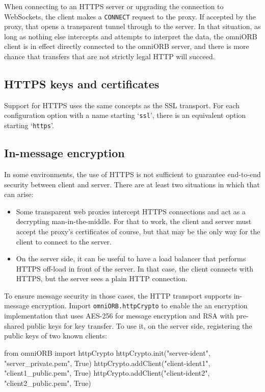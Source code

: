\documentclass[11pt,oneside,a4paper]{book}
\newcommand{\code}[1]{\texttt{#1}}
\begin{document}
When connecting to an HTTPS server or upgrading the connection to
WebSockets, the client makes a \code{CONNECT} request to the proxy. If
accepted by the proxy, that opens a transparent tunnel through to the
server. In that situation, as long as nothing else intercepts and
attempts to interpret the data, the omniORB client is in effect
directly connected to the omniORB server, and there is more chance
that transfers that are not strictly legal HTTP will succeed.


\subsection{HTTPS keys and certificates}

Support for HTTPS uses the same concepts as the SSL transport. For
each configuration option with a name starting `\code{ssl}', there is
an equivalent option starting `\code{https}'.


\subsection{In-message encryption}

In some environments, the use of HTTPS is not sufficient to guarantee
end-to-end security between client and server. There are at least two
situations in which that can arise:

\begin{itemize}
  \item Some transparent web proxies intercept HTTPS connections and
    act as a decrypting man-in-the-middle. For that to work, the
    client and server must accept the proxy's certificates of course,
    but that may be the only way for the client to connect to the
    server.

  \item On the server side, it can be useful to have a load balancer
    that performs HTTPS off-load in front of the server. In that case,
    the client connects with HTTPS, but the server sees a plain HTTP
    connection.
\end{itemize}

To ensure message security in those cases, the HTTP transport supports
in-message encryption. Import \code{omniORB.httpCrypto} to enable the
an encryption implementation that uses AES-256 for message encryption
and RSA with pre-shared public keys for key transfer. To use it, on
the server side, registering the public keys of two known clients:

\begin{pylisting}
from omniORB import httpCrypto
httpCrypto.init("server-ident", "server_private.pem", True)
httpCrypto.addClient("client-ident1", "client1_public.pem", True)
httpCrypto.addClient("client-ident2", "client2_public.pem", True)
\end{pylisting}
\end{document}
